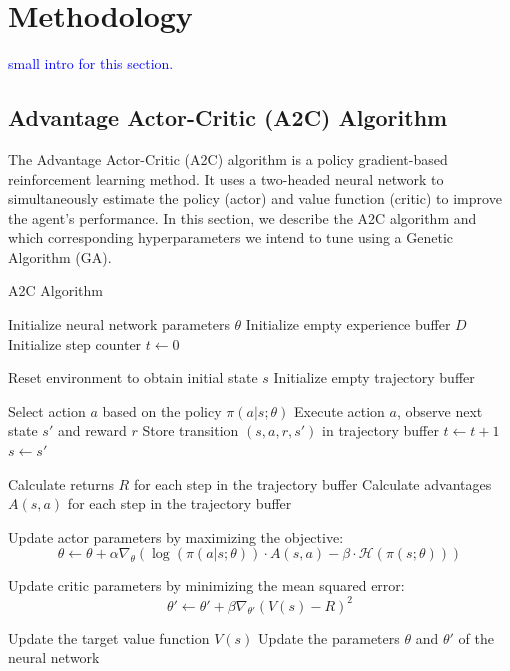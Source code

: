 \documentclass{article}
\newcommand{\TODO}[1]{\textcolor{blue}{#1}}
\begin{document}
\section{Methodology}
\label{sec:meth}

\TODO{small intro for this section.}

\subsection{Advantage Actor-Critic (A2C) Algorithm}
The Advantage Actor-Critic (A2C) algorithm is a policy gradient-based reinforcement learning method. It uses a two-headed neural network to simultaneously estimate the policy (actor) and value function (critic) to improve the agent's performance. In this section, we describe the A2C algorithm and which corresponding hyperparameters we intend to tune using a Genetic Algorithm (GA).
\begin{algorithm}[H]
  \caption{A2C Algorithm}
  \label{alg:a2c}
  \begin{algorithmic}[1]
    \STATE Initialize neural network parameters $\theta$
    \STATE Initialize empty experience buffer $D$
    \STATE Initialize step counter $t \gets 0$
    
      \STATE Reset environment to obtain initial state $s$
      \STATE Initialize empty trajectory buffer
      
        \STATE Select action $a$ based on the policy $\pi(a|s;\theta)$
        \STATE Execute action $a$, observe next state $s'$ and reward $r$
        \STATE Store transition $(s, a, r, s')$ in trajectory buffer
        \STATE $t \gets t + 1$
        \STATE $s \gets s'$
      \ENDWHILE
      
      \STATE Calculate returns $R$ for each step in the trajectory buffer
      \STATE Calculate advantages $A(s,a)$ for each step in the trajectory buffer
      
      \STATE Update actor parameters by maximizing the objective:
      \[
        \theta \gets \theta + \alpha \nabla_\theta \left( \log(\pi(a|s;\theta)) \cdot A(s,a) - \beta \cdot \mathcal{H}(\pi(s;\theta)) \right)
      \]
      
      \STATE Update critic parameters by minimizing the mean squared error:
      \[
        \theta' \gets \theta' + \beta \nabla_{\theta'} \left( V(s) - R \right)^2
      \]
      
      \STATE Update the target value function $V(s)$
      \STATE Update the parameters $\theta$ and $\theta'$ of the neural network
      
    \ENDWHILE
  \end{algorithmic}
\end{algorithm}
\end{document}
